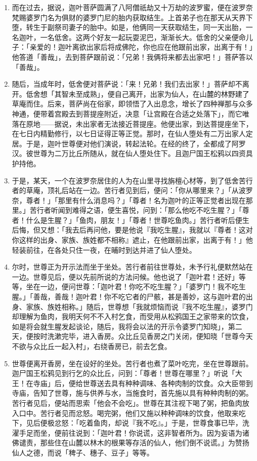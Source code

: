 \begin{enumerate}
\item 而在过去，据说，迦叶菩萨圆满了八阿僧祇劫又十万劫的波罗蜜，便在波罗奈梵赐婆罗门名为俱财的婆罗门尼的胎内获取结生。上首弟子也在那天从天界下堕，转生于副祭司妻子的胎中。如是，他俩同一天获取结生，同一天出胎，一名迦叶，一名低舍。这两个好友一起玩耍泥巴，渐渐长大。低舍的父亲便命儿子：「亲爱的！迦叶离欲出家后将成佛陀，你也应在他跟前出家，出离于有！」他答道「善哉」，去到菩萨跟前说：「兄弟！我俩将来都去出家吧！」菩萨答以「善哉」。
\item 随后，当成年时，低舍便对菩萨说：「来！兄弟！我们去出家！」菩萨却不离开。低舍想「其智未至成熟」，便自己离开，出家为仙人，在山麓的林野建了草庵而住。后来，菩萨尚在俗家，即领悟了入出息念，增长了四种禅那与众多神通，便带着宫殿去到菩提座附近，决意「让宫殿在合适之处落下」，而它唯落在原地——据说，未出家者无法接近菩提座。他便出家，到达菩提座坐下，在七日内精勤修行，以七日证得正等正觉。那时，在仙人堕处有二万出家人定居。于是，迦叶世尊便对他们演说，转起法轮。在经的终了，全都成了阿罗汉。彼世尊为二万比丘所随从，就在仙人堕处住下。且迦尸国王松鸦以四资具护持他。
\item 于是，某天，一个在波罗奈居住的人为在山里寻找旃檀心材等，到了低舍苦行者的草庵，顶礼后站在一边。苦行者见到后，便问：「你从哪里来？」「从波罗奈，尊者！」「那里有什么消息吗？」「尊者！名为迦叶的正等正觉者出现在那里。」苦行者听闻到难得之语，便生喜悦，问到：「那么他吃不吃生腥？」「尊者！什么是生腥？」「鱼肉，朋友！」「尊者！世尊吃鱼肉。」苦行者听后便生后悔，但又想：「我去后再问他，要是他说『我吃生腥』，我就以『尊者！这对你这样的出身、家族、族姓都不相称』遮止，在他跟前出家，出离于有！」他轻装前往，在各处只住一夜，在晡时到达并进了仙人堕处。
\item 尔时，世尊正为开示法而坐于坐处。苦行者前往世尊处，未予行礼便默然站在一边。世尊见后，便以先前所说的方法问候。他也说了「迦叶君！还好」等等，坐在一边，便问世尊：「迦叶君！你吃不吃生腥？」「婆罗门！我不吃生腥。」「善哉，善哉！迦叶君！你不吃它者的尸骸，甚是善妙，这与迦叶君的出身、家族、族姓相称。」随后，世尊想「我就烦恼而说『我不吃生腥』，婆罗门却理解为鱼肉，我明天何不不入村乞食，而受用从松鸦国王之家带来的饮食，如是将会就生腥发起谈论，随后，我将会以法的开示令婆罗门知晓」，第二天，便按时洗漱完毕，进入香房。众比丘见香房之门关闭，便知晓「世尊今天不欲与众比丘一起入村」，右绕香房已，前去乞食。
\item 世尊便离开香房，坐在设好的坐处。苦行者也煮了菜叶吃完，坐在世尊跟前。迦尸国王松鸦见到行乞的众比丘，问到：「尊者！世尊在哪里？」听说「大王！在寺庙」后，便给世尊送去具有种种调味、各种肉制的饮食。众大臣带到寺庙，告知了世尊，施与供养与水，当施食时，首先施以具有种种肉制的粥。苦行者见后，便站而思索「他会不会吃」。世尊在其注视下喝了粥，把鱼肉放入口中。苦行者见而忿怒。喝完粥，他们又施以种种调味的饮食，他取来吃下，见后便极忿怒：「吃着鱼肉，却说『我不吃』。」于是，世尊食事已毕，洗濯手足而坐，便前往说到：「迦叶君！你说谎，这非智者所为。因为妄语为诸佛谴责，那些住在山麓以林木的根果等存活的仙人，他们倒不说谎。」为赞扬仙人之德，而说「稗子、穗子、豆子」等等。\end{enumerate}

